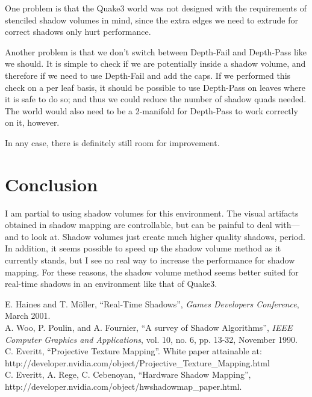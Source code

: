 \documentclass{llncs}
\begin{document}
\begin{multicols}{2}
{One problem is that the Quake3 world was not designed with the requirements of
stenciled shadow volumes in mind, since the extra edges we need to extrude
for correct shadows only hurt performance.  

Another problem is that we don't switch between Depth-Fail and Depth-Pass like we should.
It is simple to check if we are potentially inside a shadow
volume, and therefore if we need to use Depth-Fail and add the caps.  
If we performed this check on a per 
leaf basis, it should be possible to use Depth-Pass on leaves where it is safe to do so; 
and thus we could reduce the number of shadow quads needed.
The world would also need to be a 2-manifold for Depth-Pass to
work correctly on it, however.

In any case, there is definitely still room for improvement. 

\section{Conclusion}
I am partial to using shadow volumes for this environment.
The visual artifacts obtained in shadow mapping are controllable, but can be 
painful to deal with---and to look at. 
Shadow volumes just create much higher quality shadows, period. 
In addition, it seems possible to speed up the shadow volume
method as it currently stands, but I see no real way to increase the performance for
shadow mapping.  For these reasons, the shadow volume method seems better suited
for real-time shadows in an environment like that of Quake3. 

%
%
\begin{thebibliography}{5}
E. Haines and T. M\"{o}ller, ``Real-Time Shadows'', \textit{Games Developers Conference},
March 2001. 
\\

A. Woo, P. Poulin, and A. Fournier, 
``A survey of Shadow Algorithms'', \textit{IEEE Computer Graphics and Applications}, 
vol. 10, no. 6, pp. 13-32, November 1990.
\\

C. Everitt, ``Projective Texture Mapping''. White paper attainable at:
http://developer.nvidia.com/object/Projective\_Texture\_Mapping.html
\\

C. Everitt, A. Rege, C. Cebenoyan, ``Hardware Shadow Mapping'',
http://developer.nvidia.com/object/hwshadowmap\_paper.html.
\\


\end{thebibliography}}
\end{multicols}
\end{document}

